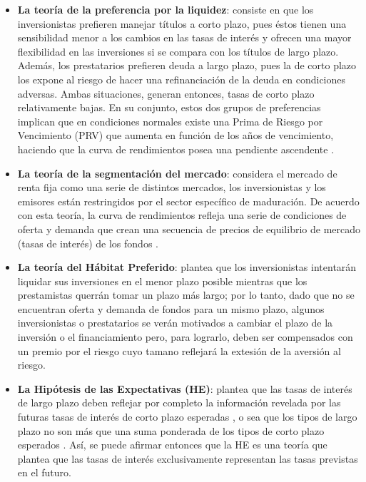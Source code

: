 \begin{itemize}
  \item \textbf{La teor\'ia de la preferencia por la liquidez}: consiste en que los inversionistas prefieren manejar t\'itulos a corto plazo, pues \'estos tienen una sensibilidad menor a los cambios en las tasas de inter\'es y ofrecen una mayor flexibilidad en las inversiones si se compara con los t\'itulos de largo plazo. Adem\'as, los prestatarios prefieren deuda a largo plazo, pues la de corto plazo los expone al riesgo de hacer una refinanciaci\'on de la deuda en condiciones adversas. Ambas situaciones, generan entonces, tasas de corto plazo relativamente bajas. En su conjunto, estos dos grupos de preferencias implican que en condiciones normales existe una Prima de Riesgo por Vencimiento (PRV) que aumenta en funci\'on de los a\~nos de vencimiento, haciendo que la curva de rendimientos posea una pendiente ascendente \cite{DO}.
  \item \textbf{La teor\'ia de la segmentaci\'on del mercado}: considera el mercado de renta fija como una serie de distintos mercados, los inversionistas y los emisores est\'an restringidos por el sector espec\'ifico de maduraci\'on. De acuerdo con esta teor\'ia, la curva de rendimientos refleja una serie de condiciones de oferta y demanda que crean una secuencia de precios de equilibrio de mercado (tasas de inter\'es) de los fondos \cite{DO}.
  \item \textbf{La teor\'ia del H\'abitat Preferido}: plantea que los inversionistas intentar\'an liquidar sus inversiones en el menor plazo posible mientras que los prestamistas querr\'an tomar un plazo m\'as largo; por lo tanto, dado que no se encuentran oferta y demanda de fondos para un mismo plazo, algunos inversionistas o prestatarios se ver\'an motivados a cambiar el plazo de la inversi\'on o el financiamiento pero, para lograrlo, deben ser compensados con un premio por el riesgo cuyo tamano reflejar\'a la extesi\'on de la aversi\'on al riesgo.
  \item \textbf{La Hip\'otesis de las Expectativas (HE)}: plantea que las tasas de inter\'es de largo plazo deben reflejar por completo la informaci\'on revelada por las futuras tasas de inter\'es de corto plazo esperadas \cite{YS}, o sea que los tipos de largo plazo no son m\'as que una suma ponderada de los tipos de corto plazo esperados \cite{FR}. As\'i, se puede afirmar entonces que la HE es una teor\'ia que plantea que las tasas de inter\'es exclusivamente representan las tasas previstas en el futuro.
\end{itemize}



